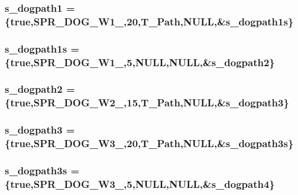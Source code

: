 \label{WL__ACT2_8C_a13801465629bd18b57ad2d9bfa6b8fab}
\hypertarget{WL__ACT2_8C_a2e8c7bd87e415805e988798640b496aa}{
\subsubsection[{s\_\-dogpath1}]{ {\bf s\_\-dogpath1} = \{true,SPR\_\-DOG\_\-W1\_,20,T\_\-Path,NULL,\&{\bf s\_\-dogpath1s}\}}}
\label{WL__ACT2_8C_a2e8c7bd87e415805e988798640b496aa}
\hypertarget{WL__ACT2_8C_a833365b947ba63ec1421667cc9b28198}{
\subsubsection[{s\_\-dogpath1s}]{ {\bf s\_\-dogpath1s} = \{true,SPR\_\-DOG\_\-W1\_,5,NULL,NULL,\&{\bf s\_\-dogpath2}\}}}
\label{WL__ACT2_8C_a833365b947ba63ec1421667cc9b28198}
\hypertarget{WL__ACT2_8C_aa842775dfccebc1a72425be58f7dd4b1}{
\subsubsection[{s\_\-dogpath2}]{ {\bf s\_\-dogpath2} = \{true,SPR\_\-DOG\_\-W2\_,15,T\_\-Path,NULL,\&{\bf s\_\-dogpath3}\}}}
\label{WL__ACT2_8C_aa842775dfccebc1a72425be58f7dd4b1}
\hypertarget{WL__ACT2_8C_ac49edfef8b2bf3f1bfcb8f6bdeeba025}{
\subsubsection[{s\_\-dogpath3}]{ {\bf s\_\-dogpath3} = \{true,SPR\_\-DOG\_\-W3\_,20,T\_\-Path,NULL,\&{\bf s\_\-dogpath3s}\}}}
\label{WL__ACT2_8C_ac49edfef8b2bf3f1bfcb8f6bdeeba025}
\hypertarget{WL__ACT2_8C_a358e51ea36b7aaa63ab7269544e049f8}{
\subsubsection[{s\_\-dogpath3s}]{ {\bf s\_\-dogpath3s} = \{true,SPR\_\-DOG\_\-W3\_,5,NULL,NULL,\&{\bf s\_\-dogpath4}\}}}
